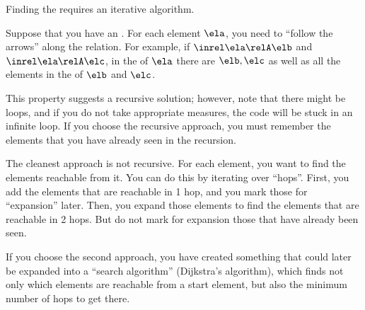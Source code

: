 
\begin{hint}
    Finding the  requires an iterative algorithm.

    Suppose that you have an  \relA.
    For each element $\ela$, you need to ``follow the arrows'' along the relation.
    For example, if  $\inrel \ela \relA \elb$ and  $\inrel \ela \relA \elc$, in the  of $\ela$ there are $\elb, \elc$ as well as all the elements in the  of $\elb$ and $\elc$.

    This property suggests a recursive solution; however, note that there might be loops, and if you do not take appropriate measures, the code will be stuck in an infinite loop.
    If you choose the recursive approach, you must remember the elements that you have already seen in the recursion.

    The cleanest approach is not recursive.
    For each element, you want to find the elements reachable from it.
    You can do this by iterating over ``hops''.
    First, you add the elements that are reachable in 1 hop, and you mark those for ``expansion'' later.
    Then, you expand those elements to find the elements that are reachable in 2 hops.
    But do not mark for expansion those that have already been seen.

    If you choose the second approach, you have created something that could later be expanded into a ``search algorithm'' (Dijkstra's algorithm), which finds not only which elements are reachable from a start element, but also the minimum number of hops to get there.
\end{hint}
